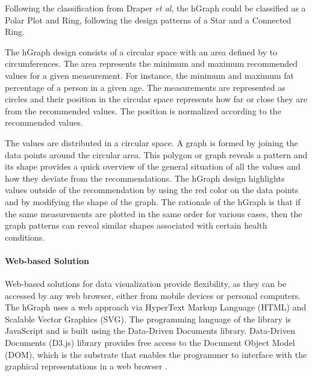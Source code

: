 \documentclass[twocolumn]{bmcart}%
\begin{document}
Following the classification from Draper \textit{et al}, the hGraph could be classified as a Polar Plot and Ring, following the design patterns of a Star and a Connected Ring.

The hGraph design consists of a circular space with an area defined by to circumferences. The area represents the minimum and maximum recommended values for a given measurement. For instance, the minimum and maximum fat percentage of a person in a given age. The measurements are represented as circles and their position in the circular space represents how far or close they are from the recommended values. The position is normalized according to the recommended values.

The values are distributed in a circular space. A graph is formed by joining the data points around the circular area. This polygon or graph reveals a pattern and its shape provides a quick overview of the general situation of all the values and how they deviate from the recommendations. The hGraph design highlights values outside of the recommendation by using the red color on the data points and by modifying the shape of the graph. The rationale of the hGraph is that if the same measurements are plotted in the same order for various cases, then the graph patterns can reveal similar shapes associated with certain health conditions.

\paragraph*{Web-based Solution}
Web-based solutions for data visualization provide flexibility, as they can be accessed by any web browser, either from mobile devices or personal computers. The hGraph uses a web approach via HyperText Markup Language (HTML) and Scalable Vector Graphics (SVG). The programming language of the library is JavaScript and is built using the Data-Driven Documents library. Data-Driven Documents (D3.js) library provides free access to the Document Object Model (DOM), which is the substrate that enables the programmer to interface with the graphical representations in a web browser \cite{bostock2011d3}.

\end{document}

